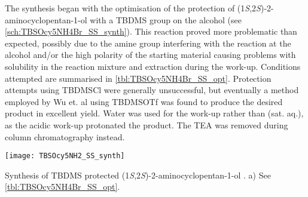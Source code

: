 
The synthesis began with the optimisation of the protection of (1\textit{S},2\textit{S})-2-aminocyclopentan-1-ol  with a TBDMS group on the alcohol (see \ref{sch:TBSOcy5NH4Br_SS_synth}).
This reaction proved more problematic than expected, possibly due to the amine group interfering with the reaction at the alcohol and/or the high polarity of the starting material causing problems with solubility in the reaction mixture and extraction during the work-up. Conditions attempted are summarised in \ref{tbl:TBSOcy5NH4Br_SS_opt}. Protection attempts using TBDMSCl were generally unsuccessful, but eventually a method employed by Wu et. al\cite{Wu2012} using TBDMSOTf was found to produce the desired product in excellent yield. Water was used for the work-up rather than  (sat. aq.), as the acidic work-up protonated the product. The TEA was removed during column chromatography instead.


\begin{scheme}[H]
	\begin{center}
		\texttt{[image: TBSOcy5NH2\_SS\_synth]}
		\caption{Synthesis of TBDMS protected (1\textit{S},2\textit{S})-2-aminocyclopentan-1-ol . 
		a) See \ref{tbl:TBSOcy5NH4Br_SS_opt}.
		\label{sch:TBSOcy5NH2_SS_synth}}
	\end{center}
\end{scheme}

